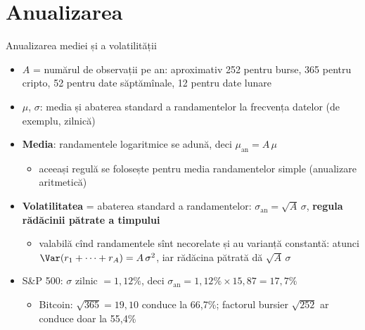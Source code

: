 \section{Anualizarea}

\begin{frame}{Anualizarea mediei și a volatilității}
\itemsize{\small}
\begin{itemize}
    \item $A$ = numărul de observații pe an: aproximativ 252 pentru burse, 365 pentru cripto, 52 pentru date săptămînale, 12 pentru date lunare
    \item $\mu$, $\sigma$: media și abaterea standard a randamentelor la frecvența datelor (de exemplu, zilnică)
    \item \textbf{Media}: randamentele logaritmice se adună, deci $\mu_{\text{an}} = A\,\mu$
    \begin{itemize}
        \item aceeași regulă se folosește pentru media randamentelor simple (anualizare aritmetică)
    \end{itemize}
    \item \textbf{Volatilitatea} = abaterea standard a randamentelor: $\sigma_{\text{an}} = \sqrt{A}\,\sigma$, \textbf{regula rădăcinii pătrate a timpului}
    \begin{itemize}
        \item valabilă cînd randamentele sînt necorelate și au varianță constantă: atunci $\Var(r_1 + \dots + r_A) = A\,\sigma^2$, iar rădăcina pătrată dă $\sqrt{A}\,\sigma$
    \end{itemize}
    \item S\&P 500: $\sigma$ zilnic $= 1{,}12\%$, deci $\sigma_{\text{an}} = 1{,}12\% \times 15{,}87 = 17{,}7\%$
    \begin{itemize}
        \item Bitcoin: $\sqrt{365} = 19{,}10$ conduce la 66{,}7\%; factorul bursier $\sqrt{252}$ ar conduce doar la 55{,}4\%
    \end{itemize}
\end{itemize}
\end{frame}

